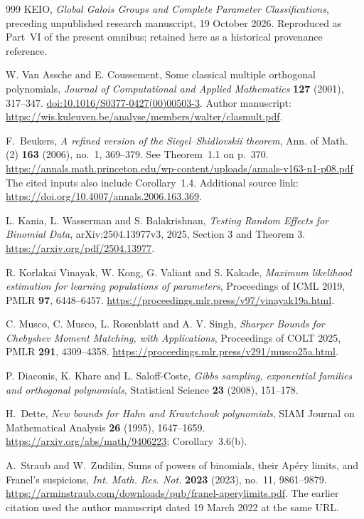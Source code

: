 \documentclass[11pt,a4paper]{article}
\theoremstyle{definition}
\theoremstyle{remark}
\numberwithin{equation}{section}
\begin{document}
\begin{thebibliography}{999}
KEIO, \emph{Global Galois Groups and Complete Parameter Classifications},
preceding unpublished research manuscript, 19 October 2026.
Reproduced as Part~VI of the present omnibus; retained here as a historical provenance reference.

W. Van Assche and E. Coussement, Some classical multiple orthogonal
polynomials, \emph{Journal of Computational and Applied Mathematics}
\textbf{127} (2001), 317--347.
\href{https://doi.org/10.1016/S0377-0427(00)00503-3}{doi:10.1016/S0377-0427(00)00503-3}.
Author manuscript: \url{https://wis.kuleuven.be/analyse/members/walter/clasmult.pdf}.

F.~Beukers,
\emph{A refined version of the Siegel--Shidlovskii theorem},
Ann. of Math. (2) \textbf{163} (2006), no.~1, 369--379.
See Theorem~1.1 on p.~370.
\url{https://annals.math.princeton.edu/wp-content/uploads/annals-v163-n1-p08.pdf}
The cited inputs also include Corollary~1.4.
Additional source link: \url{https://doi.org/10.4007/annals.2006.163.369}.

L. Kania, L. Wasserman and S. Balakrishnan,
\emph{Testing Random Effects for Binomial Data}, arXiv:2504.13977v3,
2025, Section 3 and Theorem 3.
\url{https://arxiv.org/pdf/2504.13977}.

R. Korlakai Vinayak, W. Kong, G. Valiant and S. Kakade,
\emph{Maximum likelihood estimation for learning populations of parameters},
Proceedings of ICML 2019, PMLR \textbf{97}, 6448--6457.
\url{https://proceedings.mlr.press/v97/vinayak19a.html}.

C. Musco, C. Musco, L. Rosenblatt and A. V. Singh,
\emph{Sharper Bounds for Chebyshev Moment Matching, with Applications},
Proceedings of COLT 2025, PMLR \textbf{291}, 4309--4358.
\url{https://proceedings.mlr.press/v291/musco25a.html}.

P. Diaconis, K. Khare and L. Saloff-Coste,
\emph{Gibbs sampling, exponential families and orthogonal polynomials},
Statistical Science \textbf{23} (2008), 151--178.

H.~Dette, \emph{New bounds for Hahn and Krawtchouk polynomials},
SIAM Journal on Mathematical Analysis \textbf{26} (1995), 1647--1659.
\url{https://arxiv.org/abs/math/9406223}; Corollary~3.6(b).

A.~Straub and W.~Zudilin, Sums of powers of binomials, their Ap\'ery
limits, and Franel's suspicions, \emph{Int. Math. Res. Not.}
\textbf{2023} (2023), no.~11, 9861--9879.
\url{https://arminstraub.com/downloads/pub/franel-aperylimits.pdf}.
The earlier citation used the author manuscript dated 19 March 2022 at the same URL.


\end{thebibliography}
\end{document}
